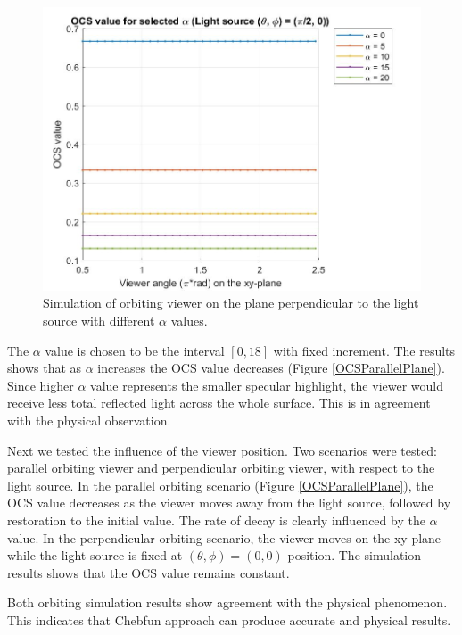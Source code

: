 \documentclass[11pt]{amsart}
\theoremstyle{definition}
\begin{document}
\begin{figure}[h]
\centering \includegraphics[scale=0.4]{./figs/OCS_perpendicular_plane}
\caption{Simulation of orbiting viewer on the plane perpendicular to the light source with different $\alpha$ values.}
\label{OCSPerpendicularPlane}
\end{figure}

The $\alpha$ value is chosen to be the interval $[0,18]$ with fixed increment. The results shows that as $\alpha$ increases the OCS value decreases (Figure \ref{OCSParallelPlane}). Since higher $\alpha$ value represents the smaller specular highlight, the viewer would receive less total reflected light across the whole surface. This is in agreement with the physical observation.

Next we tested the influence of the viewer position. Two scenarios were tested: parallel orbiting viewer and perpendicular orbiting viewer, with respect to the light source. In the parallel orbiting scenario (Figure \ref{OCSParallelPlane}), the OCS value decreases as the viewer moves away from the light source, followed by restoration to the initial value. The rate of decay is clearly influenced by the $\alpha$ value. In the perpendicular orbiting scenario, the viewer moves on the xy-plane while the light source is fixed at $(\theta, \phi) = (0,0)$ position. The simulation results shows that the OCS value remains constant.

Both orbiting simulation results show agreement with the physical phenomenon. This indicates that Chebfun approach can produce accurate and physical results.
\end{document}
